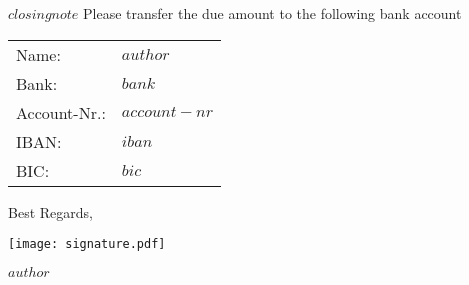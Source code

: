 \documentclass[$fontsize$, a4paper]{article}
\renewcommand{\arraystretch}{1.5} %
\begin{document}
\vspace{3em}

\sffamily
\small
$closingnote$
Please transfer the due amount to the following bank account\\

\vspace{3mm}
\renewcommand{\arraystretch}{1} 
\begin{tabular}{ll}
  Name: & $author$\\
  Bank: & $bank$\\
  Account-Nr.: & $account-nr$\\
  IBAN: & $iban$\\
  BIC: & $bic$
\end{tabular}

\vspace{6em}
Best Regards,\\
\medskip

{
      \texttt{[image: signature.pdf]} \par
}

$author$
\end{document}
